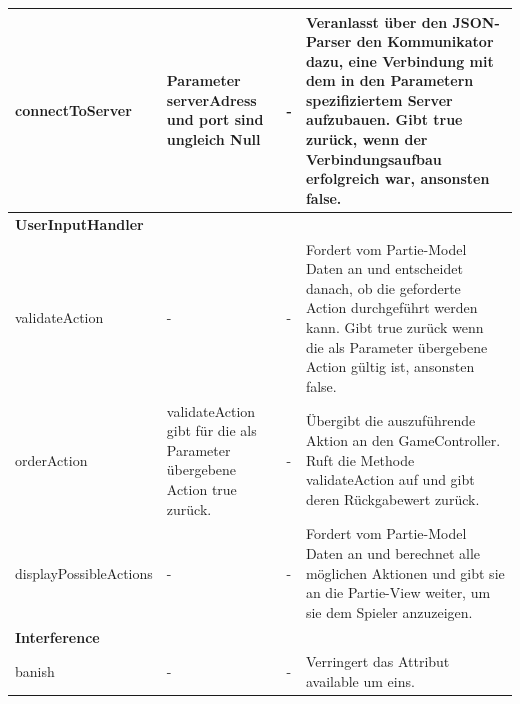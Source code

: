 \begin{center}
	\begin{tabular}{|p{4.7cm}|p{3.5cm}|p{3.5cm}|p{4.3cm}|}	
		\hline
		connectToServer & Parameter serverAdress und port sind ungleich Null & - & Veranlasst über den JSON-Parser den Kommunikator dazu, eine Verbindung mit dem in den Parametern spezifiziertem Server aufzubauen. Gibt true zurück, wenn der Verbindungsaufbau erfolgreich war, ansonsten false.\\\hline
		\multicolumn{4}{|l|}{\textbf{UserInputHandler}} \\\hline
		validateAction & - & - & Fordert vom Partie-Model Daten an und entscheidet danach, ob die geforderte Action durchgeführt werden kann. Gibt true zurück wenn die als Parameter übergebene Action gültig ist, ansonsten false.\\\hline
		orderAction & validateAction gibt für die als Parameter übergebene Action true zurück. & - & Übergibt die auszuführende Aktion an den GameController. Ruft die Methode validateAction auf und gibt deren Rückgabewert zurück.\\\hline
		displayPossibleActions & - & - & Fordert vom Partie-Model Daten an und berechnet alle möglichen Aktionen und gibt sie an die Partie-View weiter, um sie dem Spieler anzuzeigen.\\\hline
		\multicolumn{4}{|l|}{\textbf{Interference}} \\\hline
		banish & - & - & Verringert das Attribut available um eins.\\\hline
		
	\end{tabular}
\end{center}
